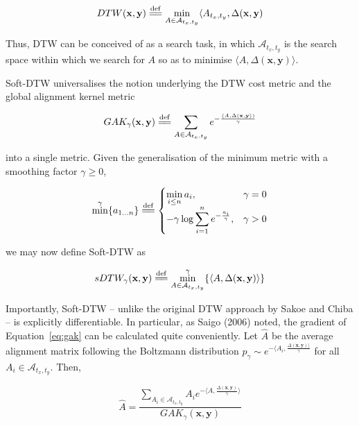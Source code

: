 \documentclass{article}
\newcommand{\eqdef}{\overset{\mathrm{def}}{=\joinrel=}}
\begin{document}
\begin{equation}
	DTW(\mathbf{x}, \mathbf{y}) \eqdef \min_{A \in \mathcal{A}_{t_x, t_y}} \langle A_{t_x, t_y}, \Delta(\mathbf{x}, \mathbf{y})
\end{equation}

Thus, DTW can be conceived of as a search task, in which $\mathcal{A}_{t_x, t_y}$ is the search space within which we search for $A$ so as to minimise $\langle A, \Delta(\mathbf{x}, \mathbf{y}) \rangle$. 

Soft-DTW universalises the notion underlying the DTW cost metric and the global alignment kernel metric

\begin{equation}
	GAK_{\gamma}(\mathbf{x}, \mathbf{y}) \eqdef \sum_{A \in \mathcal{A}_{t_x, t_y}} e^{- \frac{\langle A, \Delta(\mathbf{x}, \mathbf{y} \rangle)}{\gamma}}
	\label{eq:gak}
\end{equation}

\noindent into a single metric.\cite{janati2020spatio} Given the generalisation of the minimum metric with a smoothing factor $\gamma \geq 0$,

\begin{equation}
	\min^{\gamma} \{a_{1 \ldots n}\} \eqdef 
	\begin{cases}
		\displaystyle \min_{i \leq n} a_i, 								& \gamma = 0 \\
		- \gamma \log \displaystyle \sum_{i=1}^n e^{-\frac{a_i}{\gamma}},	& \gamma > 0
	\end{cases}
\end{equation}

\noindent we may now define Soft-DTW as

\begin{equation}
	sDTW_{\gamma}(\mathbf{x}, \mathbf{y}) \eqdef \min_{A \in \mathcal{A}_{t_x, t_y}} ^{\gamma} \{ \langle A, \Delta(\mathbf{x}, \mathbf{y}) \rangle \}
\end{equation}

Importantly, Soft-DTW -- unlike the original DTW approach by Sakoe and Chiba\cite{sakoe1978dynamic} -- is explicitly differentiable. In particular, as Saigo (2006) noted,\cite{saigo2006optimizing} the gradient of 
 Equation~\eqref{eq:gak} can be calculated quite conveniently. Let $\hat{A}$ be the average alignment matrix following the Boltzmann distribution $p_{\gamma} \sim e^{- \langle A_i, \frac{\Delta(\mathbf{x}, \mathbf{y}) \rangle}{\gamma}}$ for all $A_i \in \mathcal{A}_{t_x, t_y}$. Then, 
 
\begin{equation}
 	\hat{A} = \frac{\displaystyle \sum_{A_i \in \mathcal{A}_{t_x, t_y}} A_i e^{- \langle A, \frac{\Delta(\mathbf{x}, \mathbf{y})}{\gamma}\rangle}}{GAK_{\gamma}(\mathbf{x}, \mathbf{y})}
 \end{equation}
\end{document}

